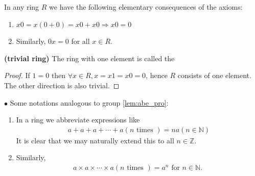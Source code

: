 \documentclass{article}
\newcommand{\bfs}[1]{\textbf{({#1}) }}
\begin{document}
\begin{thma}\label{thm:dsoanfda}
In any ring $R$ we have the following elementary consequences of the axioms:
\begin{enumerate}
    \item $x 0=x(0+0)=x 0+x 0 \Rightarrow x 0=0$
    \item Similarly, $0 x=0$ for all $x \in R$.
\end{enumerate}
\end{thma}
\begin{thma}\label{thm:incnzcd}\bfs{trivial ring}The ring with one element is called the 

\centerline{}
\end{thma}
\begin{proof}
If $1=0$ then $\forall x \in R, x=x 1=x 0=0$, hence $R$ consists of one element. The other direction is also trivial.
\end{proof}

$\bullet$ Some notations analogous to group \cref{lem:abe_pro}: 
\begin{enumerate}
    \item In a ring we abbreviate expressions like
\begin{align*}
a+a+a+\cdots+a(n \text { times })=n a(n \in \mathbb{N})
\end{align*}
It is clear that we may naturally extend this to all $n \in \mathbb{Z}$.
\item Similarly,
\begin{align*}
a \times a \times \cdots \times a(n \text { times })=a^{n} \text { for } n \in \mathbb{N} \text {. }
\end{align*}
\end{enumerate}
\end{document}

